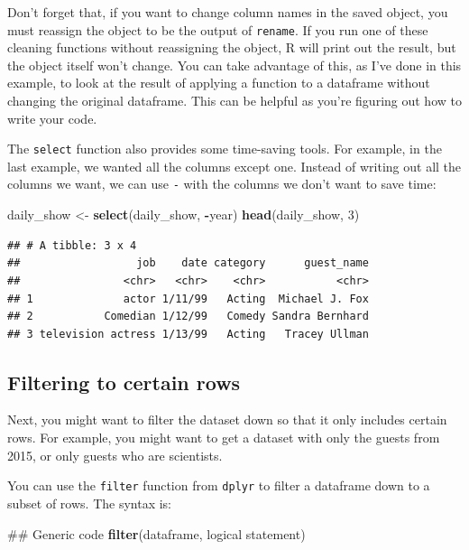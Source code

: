\documentclass[]{book}
\makeatletter
\newenvironment{Shaded}{\begin{snugshade}}{\end{snugshade}}
\newcommand{\KeywordTok}[1]{\textcolor[rgb]{0.13,0.29,0.53}{\textbf{#1}}}
\newcommand{\DecValTok}[1]{\textcolor[rgb]{0.00,0.00,0.81}{#1}}
\newcommand{\StringTok}[1]{\textcolor[rgb]{0.31,0.60,0.02}{#1}}
\newcommand{\OperatorTok}[1]{\textcolor[rgb]{0.81,0.36,0.00}{\textbf{#1}}}
\newcommand{\NormalTok}[1]{#1}
\newenvironment{kframe}{%
\medskip{}
\setlength{\fboxsep}{.8em}
 \def\at@end@of@kframe{}%
 \ifinner\ifhmode%
  \def\at@end@of@kframe{\end{minipage}}%
  \begin{minipage}{\columnwidth}%
 \fi\fi%
 \def\FrameCommand##1{\hskip\@totalleftmargin \hskip-\fboxsep
 \colorbox{shadecolor}{##1}\hskip-\fboxsep
     \hskip-\linewidth \hskip-\@totalleftmargin \hskip\columnwidth}%
 \MakeFramed {\advance\hsize-\width
   \@totalleftmargin\z@ \linewidth\hsize
   \@setminipage}}%
 {\par\unskip\endMakeFramed%
 \at@end@of@kframe}
\renewenvironment{Shaded}{\begin{kframe}}{\end{kframe}}
\newenvironment{rmdblock}[1]
  {
  \begin{itemize}
  \renewcommand{\labelitemi}{
    \raisebox{-.7\height}[0pt][0pt]{
      {\setkeys{Gin}{width=3em,keepaspectratio}\texttt{[image: images/\#1]}}
    }
  }
  \setlength{\fboxsep}{1em}
  \begin{kframe}
  \item
  }
  {
  \end{kframe}
  \end{itemize}
  }
\newenvironment{rmdwarning}
  {\begin{rmdblock}{warning}}
  {\end{rmdblock}}
\theoremstyle{definition}
\theoremstyle{definition}
\theoremstyle{definition}
\theoremstyle{remark}
\makeatother
\begin{document}
\begin{rmdwarning}
Don't forget that, if you want to change column names in the saved
object, you must reassign the object to be the output of
\texttt{rename}. If you run one of these cleaning functions without
reassigning the object, R will print out the result, but the object
itself won't change. You can take advantage of this, as I've done in
this example, to look at the result of applying a function to a
dataframe without changing the original dataframe. This can be helpful
as you're figuring out how to write your code.
\end{rmdwarning}

The \texttt{select} function also provides some time-saving tools. For
example, in the last example, we wanted all the columns except one.
Instead of writing out all the columns we want, we can use \texttt{-}
with the columns we don't want to save time:

\begin{Shaded}
\begin{Highlighting}[]
\NormalTok{daily_show <-}\StringTok{ }\KeywordTok{select}\NormalTok{(daily_show, }\OperatorTok{-}\NormalTok{year)}
\KeywordTok{head}\NormalTok{(daily_show, }\DecValTok{3}\NormalTok{)}
\end{Highlighting}
\end{Shaded}

\begin{verbatim}
## # A tibble: 3 x 4
##                  job    date category      guest_name
##                <chr>   <chr>    <chr>           <chr>
## 1              actor 1/11/99   Acting  Michael J. Fox
## 2           Comedian 1/12/99   Comedy Sandra Bernhard
## 3 television actress 1/13/99   Acting   Tracey Ullman
\end{verbatim}

\subsection{Filtering to certain rows}\label{filtering-to-certain-rows}

Next, you might want to filter the dataset down so that it only includes
certain rows. For example, you might want to get a dataset with only the
guests from 2015, or only guests who are scientists.

You can use the \texttt{filter} function from \texttt{dplyr} to filter a
dataframe down to a subset of rows. The syntax is:

\begin{Shaded}
\begin{Highlighting}[]
\NormalTok{## Generic code}
\KeywordTok{filter}\NormalTok{(dataframe, logical statement)}
\end{Highlighting}
\end{Shaded}
\end{document}
